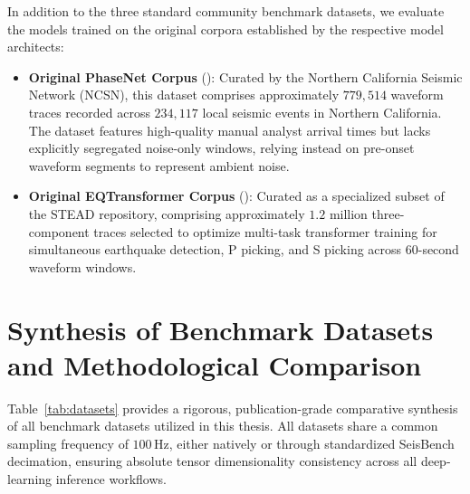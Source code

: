 In addition to the three standard community benchmark datasets, we evaluate the models trained on the original corpora established by the respective model architects:
\begin{itemize}
  \item \textbf{Original PhaseNet Corpus} (\cite{PhaseNet}): Curated by the Northern California Seismic Network (NCSN), this dataset comprises approximately $779,514$ waveform traces recorded across $234,117$ local seismic events in Northern California. The dataset features high-quality manual analyst arrival times but lacks explicitly segregated noise-only windows, relying instead on pre-onset waveform segments to represent ambient noise.
  \item \textbf{Original EQTransformer Corpus} (\cite{EQTransformer}): Curated as a specialized subset of the STEAD repository, comprising approximately $1.2$ million three-component traces selected to optimize multi-task transformer training for simultaneous earthquake detection, P picking, and S picking across 60-second waveform windows.
\end{itemize}

\section{Synthesis of Benchmark Datasets and Methodological Comparison}
\label{sec:dataset_synthesis}

Table~\ref{tab:datasets} provides a rigorous, publication-grade comparative synthesis of all benchmark datasets utilized in this thesis. All datasets share a common sampling frequency of $100\,\mathrm{Hz}$, either natively or through standardized SeisBench decimation, ensuring absolute tensor dimensionality consistency across all deep-learning inference workflows.

